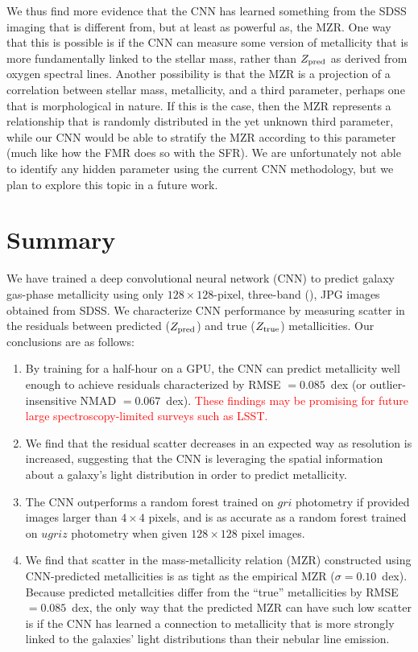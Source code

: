 \documentclass[fleqn,usenatbib]{mnras}
\newcommand{\editorial}[1]{\textcolor{red}{#1}}
\begin{document}
We thus find more evidence that the CNN has learned something from the SDSS \sdssi\sdssr\sdssg{} imaging that is different from, but at least as powerful as, the MZR. One way that this is possible is if the CNN can measure some version of metallicity that is more fundamentally linked to the stellar mass, rather than $Z_{\rm pred}$ as derived from oxygen spectral lines. Another possibility is that the MZR is a projection of a correlation between stellar mass, metallicity, and a third parameter, perhaps one that is morphological in nature. If this is the case, then the \cite{Tremonti2004} MZR represents a relationship that is randomly distributed in the yet unknown third parameter, while our CNN would be able to stratify the MZR according to this parameter (much like how the FMR does so with the SFR). We are unfortunately not able to identify any hidden parameter using the current CNN methodology, but we plan to explore this topic in a future work.

\section{Summary}\label{sec:summary}
We have trained a deep convolutional neural network (CNN) to predict galaxy gas-phase metallicity using only $128 \times 128$-pixel, three-band (\sdssi\sdssr\sdssg), JPG images obtained from SDSS. We characterize CNN performance by measuring scatter in the residuals between predicted ($Z_{\rm pred}$) and true ($Z_{\rm true}$) metallicities.
Our conclusions are as follows:

\begin{enumerate}
	\item By training for a half-hour on a GPU, the CNN can predict metallicity well enough to achieve residuals characterized by RMSE $= 0.085$~dex (or outlier-insensitive NMAD $= 0.067$~dex). \editorial{These findings may be promising for future large spectroscopy-limited surveys such as LSST.}

	\item We find that the residual scatter decreases in an expected way as resolution is increased, suggesting that the CNN is leveraging the spatial information about a galaxy's light distribution in order to predict metallicity.

	\item The CNN outperforms a random forest trained on $gri$ photometry if provided images larger than $4\times 4$ pixels, and is as accurate as a random forest trained on $ugriz$ photometry when given $128 \times 128$ pixel \sdssi\sdssr\sdssg{} images.

	\item We find that scatter in the mass-metallicity relation (MZR) constructed using CNN-predicted metallicities is as tight as the empirical MZR ($\sigma = 0.10$~dex).	Because predicted metallcities differ from the ``true'' metallicities by RMSE $= 0.085$~dex, the only way that the predicted MZR can have such low scatter is if the CNN has learned a connection to metallicity that is more strongly linked to the galaxies' light distributions than their nebular line emission.
\end{enumerate}
\end{document}
